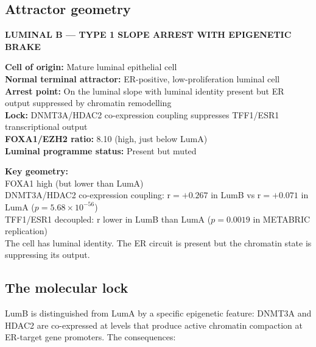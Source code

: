 \documentclass[12pt, a4paper]{article}
\begin{document}
\subsection{Attractor geometry}

\begin{center}
\colorbox{mechanismbox}{
\begin{minipage}{0.85\textwidth}
\vspace{0.5em}
\textbf{LUMINAL B --- TYPE 1 SLOPE ARREST WITH
EPIGENETIC BRAKE}

\medskip
\textbf{Cell of origin:} Mature luminal epithelial cell\\
\textbf{Normal terminal attractor:} ER-positive,
low-proliferation luminal cell\\
\textbf{Arrest point:} On the luminal slope with
luminal identity present but ER output suppressed
by chromatin remodelling\\
\textbf{Lock:} DNMT3A/HDAC2 co-expression coupling
suppresses TFF1/ESR1 transcriptional output\\
\textbf{FOXA1/EZH2 ratio:} 8.10 (high, just below LumA)\\
\textbf{Luminal programme status:} Present but muted

\medskip
\textbf{Key geometry:}\\
FOXA1 high (but lower than LumA)\\
DNMT3A/HDAC2 co-expression coupling: r$=+0.267$ in LumB
vs r$=+0.071$ in LumA ($p=5.68\times10^{-56}$)\\
TFF1/ESR1 decoupled: r lower in LumB than LumA
($p=0.0019$ in METABRIC replication)\\
The cell has luminal identity. The ER circuit is
present but the chromatin state is suppressing
its output.
\vspace{0.5em}
\end{minipage}
}
\end{center}

\subsection{The molecular lock}

LumB is distinguished from LumA by a specific
epigenetic feature: DNMT3A and HDAC2 are
co-expressed at levels that produce active
chromatin compaction at ER-target gene promoters.
The consequences:
\end{document}
